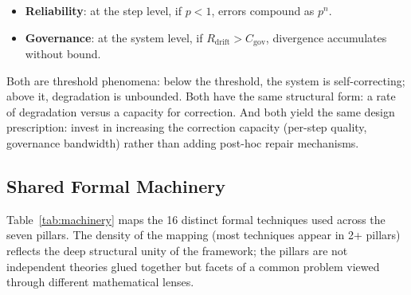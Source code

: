 \documentclass[11pt, a4paper]{googledeepmind}
\begin{document}
\begin{itemize}[nosep]
    \item \textbf{Reliability}: at the step level, if $p < 1$, errors compound as $p^n$.
    \item \textbf{Governance}: at the system level, if $R_{\text{drift}} > C_{\text{gov}}$, divergence accumulates without bound.
\end{itemize}

Both are threshold phenomena: below the threshold, the system is self-correcting; above it, degradation is unbounded. Both have the same structural form: a rate of degradation versus a capacity for correction. And both yield the same design prescription: invest in increasing the correction capacity (per-step quality, governance bandwidth) rather than adding post-hoc repair mechanisms.

\subsection{Shared Formal Machinery}
\label{sec:shared-machinery}

Table~\ref{tab:machinery} maps the 16 distinct formal techniques used across the seven pillars. The density of the mapping (most techniques appear in 2+ pillars) reflects the deep structural unity of the framework; the pillars are not independent theories glued together but facets of a common problem viewed through different mathematical lenses.
\end{document}
